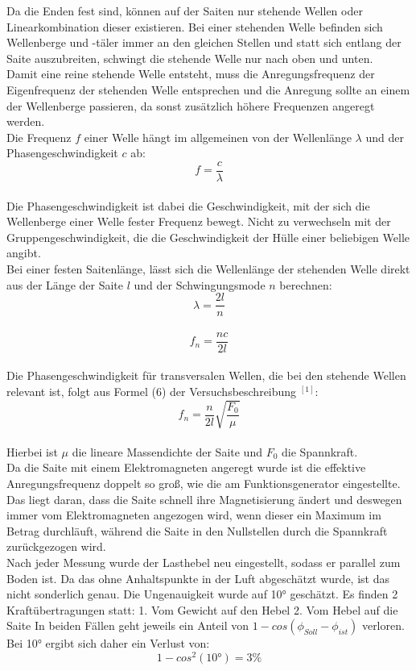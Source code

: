 \documentclass[a4paper,twocolumn]{scrartcl}
\begin{document}
Da die Enden fest sind, können auf der Saiten nur stehende Wellen oder Linearkombination dieser existieren.
Bei einer stehenden Welle befinden sich Wellenberge und -täler immer an den gleichen Stellen und statt sich entlang der Saite auszubreiten, schwingt die stehende Welle nur nach oben und unten.\\
Damit eine reine stehende Welle entsteht, muss die Anregungsfrequenz der Eigenfrequenz der stehenden Welle entsprechen und die Anregung sollte an einem der Wellenberge passieren, da sonst zusätzlich höhere Frequenzen angeregt werden.\\
Die Frequenz $f$ einer Welle hängt im allgemeinen von der Wellenlänge $\lambda$ und der Phasengeschwindigkeit $c$ ab:\\
$$f = \frac{c}{\lambda}$$\\
Die Phasengeschwindigkeit ist dabei die Geschwindigkeit, mit der sich die Wellenberge einer Welle fester Frequenz bewegt.
Nicht zu verwechseln mit der Gruppengeschwindigkeit, die die Geschwindigkeit der Hülle einer beliebigen Welle angibt.\\
Bei einer festen Saitenlänge, lässt sich die Wellenlänge der stehenden Welle direkt aus der Länge der Saite $l$ und der Schwingungsmode $n$ berechnen:\\
$$\lambda = \frac{2l}{n}$$\\
$$f_n = \frac{nc}{2l}$$\\
Die Phasengeschwindigkeit für transversalen Wellen, die bei den stehende Wellen relevant ist, folgt aus Formel (6) der Versuchsbeschreibung $^{[1]}$:
$$f_n = \frac{n}{2l}\sqrt{\frac{F_0}{\mu}}$$\\
Hierbei ist $\mu$ die lineare Massendichte der Saite und $F_0$ die Spannkraft.\\

Da die Saite mit einem Elektromagneten angeregt wurde ist die effektive Anregungsfrequenz doppelt so groß, wie die am Funktionsgenerator eingestellte. Das liegt daran, dass die Saite schnell ihre Magnetisierung ändert und deswegen immer vom Elektromagneten angezogen wird, wenn dieser ein Maximum im Betrag durchläuft, während die Saite in den Nullstellen durch die Spannkraft zurückgezogen wird.\\

Nach jeder Messung wurde der Lasthebel neu eingestellt, sodass er parallel zum Boden ist. Da das ohne Anhaltspunkte in der Luft abgeschätzt wurde, ist das nicht sonderlich genau. Die Ungenauigkeit wurde auf 10° geschätzt.
Es finden 2 Kraftübertragungen statt:
1. Vom Gewicht auf den Hebel
2. Vom Hebel auf die Saite
In beiden Fällen geht jeweils ein Anteil von $1 - cos(\phi_{Soll} - \phi_{ist})$ verloren. Bei 10° ergibt sich daher ein Verlust von:\\
$$1-cos^2(10°) = 3\%$$
\end{document}
